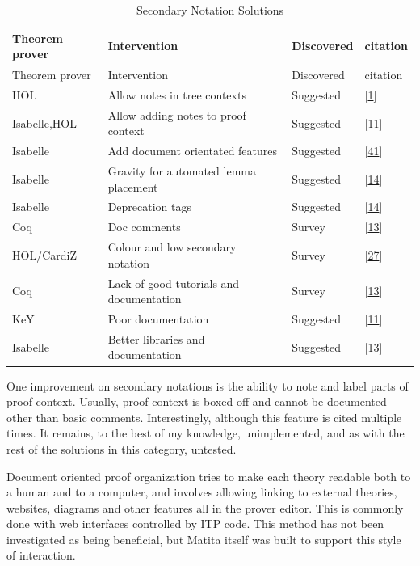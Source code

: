 \documentclass[
]{article}
\begin{document}
\hypertarget{tbl:secondary_notation}{}
\begin{longtable}[]{@{}llll@{}}
\caption{\label{tbl:secondary_notation}Secondary Notation
Solutions}\tabularnewline
\toprule
Theorem prover & Intervention & Discovered & citation \\
\midrule
\endfirsthead
\toprule
Theorem prover & Intervention & Discovered & citation \\
\midrule
\endhead
HOL & Allow notes in tree contexts & Suggested &
{[}\protect\hyperlink{ref-aitken_interactive_1998}{1}{]} \\
Isabelle,HOL & Allow adding notes to proof context & Suggested &
{[}\protect\hyperlink{ref-beckert_evaluating_2012}{11}{]} \\
Isabelle & Add document orientated features & Suggested &
{[}\protect\hyperlink{ref-wenzel_isabelle_2011}{41}{]} \\
Isabelle & Gravity for automated lemma placement & Suggested &
{[}\protect\hyperlink{ref-bourke_challenges_2012}{14}{]} \\
Isabelle & Deprecation tags & Suggested &
{[}\protect\hyperlink{ref-bourke_challenges_2012}{14}{]} \\
Coq & Doc comments & Survey &
{[}\protect\hyperlink{ref-berman_development_2014}{13}{]} \\
HOL/CardiZ & Colour and low secondary notation & Survey &
{[}\protect\hyperlink{ref-kadoda_cognitive_2000}{27}{]} \\
Coq & Lack of good tutorials and documentation & Survey &
{[}\protect\hyperlink{ref-berman_development_2014}{13}{]} \\
KeY & Poor documentation & Suggested &
{[}\protect\hyperlink{ref-beckert_evaluating_2012}{11}{]} \\
Isabelle & Better libraries and documentation & Suggested &
{[}\protect\hyperlink{ref-berman_development_2014}{13}{]} \\
\bottomrule
\end{longtable}

One improvement on secondary notations is the ability to note and label
parts of proof context. Usually, proof context is boxed off and cannot
be documented other than basic comments. Interestingly, although this
feature is cited multiple times. It remains, to the best of my
knowledge, unimplemented, and as with the rest of the solutions in this
category, untested.

Document oriented proof organization tries to make each theory readable
both to a human and to a computer, and involves allowing linking to
external theories, websites, diagrams and other features all in the
prover editor. This is commonly done with web interfaces controlled by
ITP code. This method has not been investigated as being beneficial, but
Matita itself was built to support this style of interaction.
\end{document}
